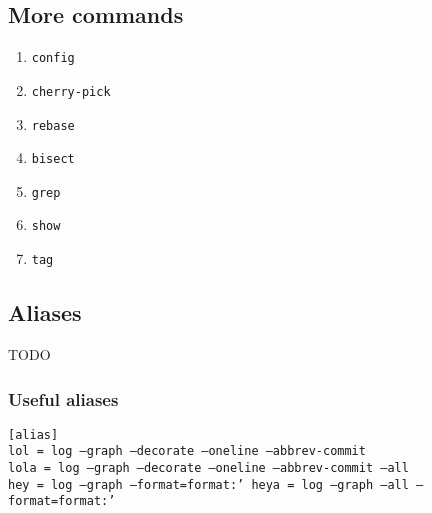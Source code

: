 \documentclass[12pt]{article}
\begin{document}
\subsection{More commands}
\begin{enumerate}

\item{\texttt{config}}

\item{\texttt{cherry-pick}}

\item{\texttt{rebase}}

\item{\texttt{bisect}}

\item{\texttt{grep}}

\item{\texttt{show}}

\item{\texttt{tag}}

\end{enumerate}

\subsection{Aliases}
TODO

\subsubsection{Useful aliases}
\texttt{[alias]\\
lol = log --graph --decorate --oneline --abbrev-commit\\
lola = log --graph --decorate --oneline --abbrev-commit --all\\
hey = log --graph --format=format:'%
heya = log --graph --all --format=format:'%
}
\end{document}
